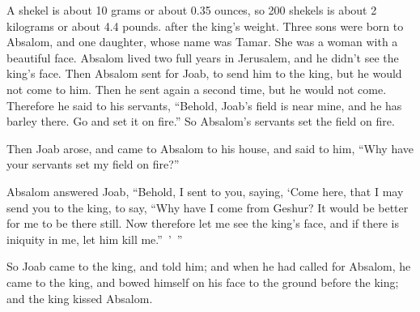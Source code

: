 {{A shekel is about 10 grams or about 0.35 ounces, so 200 shekels is about 2 kilograms or about 4.4 pounds.} after the king’s weight.
Three sons were born to Absalom, and one daughter, whose name was Tamar. She was a woman with a beautiful face.
Absalom lived two full years in Jerusalem, and he didn’t see the king’s face.
Then Absalom sent for Joab, to send him to the king, but he would not come to him. Then he sent again a second time, but he would not come.
Therefore he said to his servants, “Behold, Joab’s field is near mine, and he has barley there. Go and set it on fire.” So Absalom’s servants set the field on fire.
\par }{\PP {}Then Joab arose, and came to Absalom to his house, and said to him, “Why have your servants set my field on fire?”
\par }{\PP {}Absalom answered Joab, “Behold, I sent to you, saying, ‘Come here, that I may send you to the king, to say, “Why have I come from Geshur? It would be better for me to be there still. Now therefore let me see the king’s face, and if there is iniquity in me, let him kill me.” ’ ”
\par }{\PP {}So Joab came to the king, and told him; and when he had called for Absalom, he came to the king, and bowed himself on his face to the ground before the king; and the king kissed Absalom.

}
